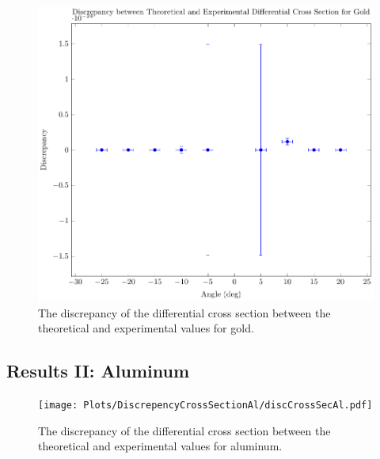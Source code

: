 \documentclass[a4paper]{article}
\begin{document}
\begin{figure}[H]
  \begin{center}
    \includegraphics[scale=0.8]{Plots/DiscrepencyCrossSectionAu/discCrossSecAu.pdf}
  \end{center}
  \caption{The discrepancy of the differential cross section between the
    theoretical and experimental values for gold.}
  \label{gph:expCrossSecUncertGold}
\end{figure}

\subsection{Results II: Aluminum}

\qq 

\qq 

\qq

\begin{figure}[H]
  \begin{center}
    \texttt{[image: Plots/DiscrepencyCrossSectionAl/discCrossSecAl.pdf]}
  \end{center}
  \caption{The discrepancy of the differential cross section between the
    theoretical and experimental values for aluminum.}
  \label{gph:expCrossSecUncertAl}
\end{figure}
\end{document}
